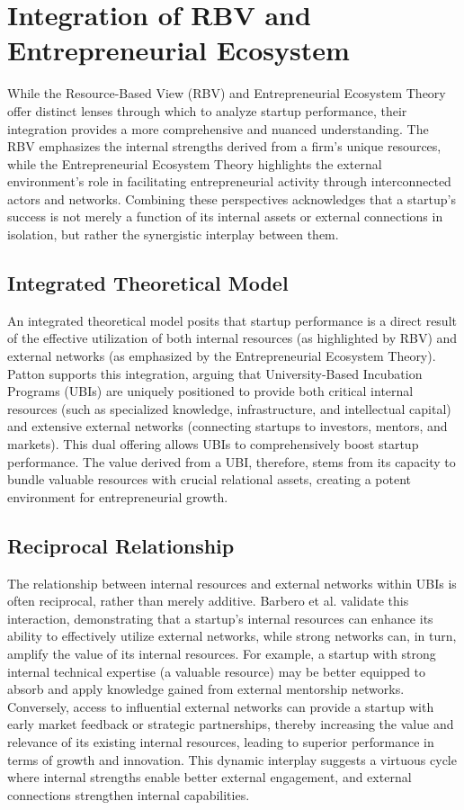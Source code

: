 \documentclass[../Main.tex]{subfiles}
\begin{document}
\section{Integration of RBV and Entrepreneurial Ecosystem}

While the Resource-Based View (RBV) and Entrepreneurial Ecosystem Theory offer distinct lenses through which to analyze startup performance, their integration provides a more comprehensive and nuanced understanding. The RBV emphasizes the internal strengths derived from a firm's unique resources, while the Entrepreneurial Ecosystem Theory highlights the external environment's role in facilitating entrepreneurial activity through interconnected actors and networks. Combining these perspectives acknowledges that a startup's success is not merely a function of its internal assets or external connections in isolation, but rather the synergistic interplay between them.

\subsection{Integrated Theoretical Model}
An integrated theoretical model posits that startup performance is a direct result of the effective utilization of both internal resources (as highlighted by RBV) and external networks (as emphasized by the Entrepreneurial Ecosystem Theory). Patton \cite{patton2014realising} supports this integration, arguing that University-Based Incubation Programs (UBIs) are uniquely positioned to provide both critical internal resources (such as specialized knowledge, infrastructure, and intellectual capital) and extensive external networks (connecting startups to investors, mentors, and markets). This dual offering allows UBIs to comprehensively boost startup performance. The value derived from a UBI, therefore, stems from its capacity to bundle valuable resources with crucial relational assets, creating a potent environment for entrepreneurial growth.

\subsection{Reciprocal Relationship}
The relationship between internal resources and external networks within UBIs is often reciprocal, rather than merely additive. Barbero et al. \cite{barbero2012revisiting} validate this interaction, demonstrating that a startup's internal resources can enhance its ability to effectively utilize external networks, while strong networks can, in turn, amplify the value of its internal resources. For example, a startup with strong internal technical expertise (a valuable resource) may be better equipped to absorb and apply knowledge gained from external mentorship networks. Conversely, access to influential external networks can provide a startup with early market feedback or strategic partnerships, thereby increasing the value and relevance of its existing internal resources, leading to superior performance in terms of growth and innovation. This dynamic interplay suggests a virtuous cycle where internal strengths enable better external engagement, and external connections strengthen internal capabilities.
\end{document}
